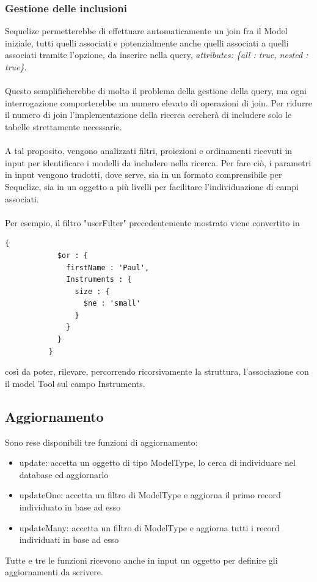 \documentclass[a4paper, 12pt]{report}
\begin{document}
      \subsubsection*{Gestione delle inclusioni}
        Sequelize permetterebbe di effettuare automaticamente un join fra il Model iniziale, tutti quelli associati e potenzialmente anche quelli associati a quelli associati tramite l'opzione, da inserire nella query,
        \emph{attributes: \{all : true, nested : true\}}.
        \paragraph*{}
        Questo semplificherebbe di molto il problema della gestione della query, ma ogni interrogazione comporterebbe un numero elevato di operazioni di join.
        Per ridurre il numero di join l'implementazione della ricerca cercherà di includere solo le tabelle strettamente necessarie.
        \paragraph*{}
        A tal proposito, vengono analizzati filtri, proiezioni e ordinamenti ricevuti in input per identificare i modelli da includere nella ricerca.
        Per fare ciò, i parametri in input vengono tradotti, dove serve, sia in un formato comprensibile per Sequelize, sia in un oggetto a più livelli per facilitare l'individuazione di campi associati.
        \paragraph*{}
        Per esempio, il filtro "userFilter" precedentemente mostrato viene convertito in
        \begin{Verbatim}[samepage=true]
          {
            $or : {
              firstName : 'Paul',
              Instruments : {
                size : {
                  $ne : 'small'
                }
              }
            }
          }
        \end{Verbatim}
        così da poter, rilevare, percorrendo ricorsivamente la struttura, l'associazione con il model Tool sul campo Instruments.
    \newpage
    \subsection{Aggiornamento}
      Sono rese disponibili tre funzioni di aggiornamento: 
      \begin{itemize}
        \item update: accetta un oggetto di tipo ModelType, lo cerca di individuare nel database ed aggiornarlo
        \item updateOne: accetta un filtro di ModelType e aggiorna il primo record individuato in base ad esso
        \item updateMany: accetta un filtro di ModelType e aggiorna tutti i record individuati in base ad esso
      \end{itemize} 
      Tutte e tre le funzioni ricevono anche in input un oggetto per definire gli aggiornamenti da scrivere.
\end{document}
